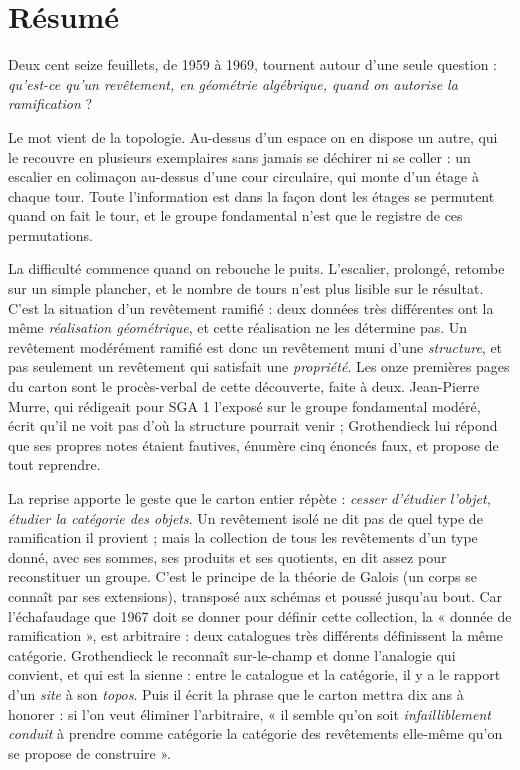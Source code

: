 \documentclass[11pt,a4paper]{article}
\begin{document}
\section*{Résumé}

\begin{resume}
Deux cent seize feuillets, de 1959 à 1969, tournent autour d'une seule
question : \emph{qu'est-ce qu'un revêtement, en géométrie algébrique, quand on
autorise la ramification} ?

Le mot vient de la topologie. Au-dessus d'un espace on en dispose un autre,
qui le recouvre en plusieurs exemplaires sans jamais se déchirer ni se coller :
un escalier en colimaçon au-dessus d'une cour circulaire, qui monte d'un étage
à chaque tour. Toute l'information est dans la façon dont les étages se
permutent quand on fait le tour, et le groupe fondamental n'est que le registre
de ces permutations.

La difficulté commence quand on rebouche le puits. L'escalier, prolongé, retombe
sur un simple plancher, et le nombre de tours n'est plus lisible sur le
résultat. C'est la situation d'un revêtement ramifié : deux données
très différentes ont la même \emph{réalisation géométrique}, et cette
réalisation ne les détermine pas. Un revêtement modérément ramifié est donc un
revêtement muni d'une \emph{structure}, et pas seulement un revêtement qui
satisfait une \emph{propriété}. Les onze premières pages du carton sont le
procès-verbal de cette découverte, faite à deux. Jean-Pierre Murre, qui
rédigeait pour SGA 1 l'exposé sur le groupe fondamental modéré, écrit qu'il ne
voit pas d'où la structure pourrait venir ; Grothendieck lui répond que ses
propres notes étaient fautives, énumère cinq énoncés faux, et propose de tout
reprendre.

La reprise apporte le geste que le carton entier répète :
\emph{cesser d'étudier l'objet, étudier la catégorie des objets}. Un revêtement
isolé ne dit pas de quel type de ramification il provient ; mais la collection
de tous les revêtements d'un type donné, avec ses sommes, ses produits et ses
quotients, en dit assez pour reconstituer un groupe. C'est le principe de la
théorie de Galois (un corps se connaît par ses extensions), transposé aux
schémas et poussé jusqu'au bout. Car
l'échafaudage que 1967 doit se donner pour définir cette collection, la
« donnée de ramification », est arbitraire : deux catalogues très différents
définissent la même catégorie. Grothendieck le reconnaît sur-le-champ et donne
l'analogie qui convient, et qui est la sienne : entre le catalogue et la catégorie, il y
a le rapport d'un \emph{site} à son \emph{topos}. Puis il écrit la phrase que
le carton mettra dix ans à honorer : si l'on veut éliminer l'arbitraire,
« il semble qu'on soit \emph{infailliblement conduit} à prendre comme catégorie
la catégorie des revêtements elle-même qu'on se propose de construire ».


\end{resume}
\end{document}
